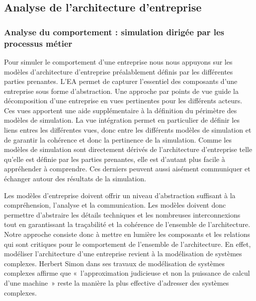     \subsection{Analyse de l'architecture d'entreprise}

        \subsubsection{Analyse du comportement : simulation dirigée par les processus
métier}

Pour simuler le comportement d'une entreprise nous nous appuyons sur les modèles
d'architecture d'entreprise préalablement définis par les différentes parties
prenantes. L'EA permet de capturer l'essentiel des composants d'une
entreprise sous forme d'abstraction. Une approche par points de vue guide la
décomposition d'une entreprise en vues pertinentes pour les différents acteurs.
Ces vues apportent une aide supplémentaire à la définition du périmètre des
modèles de simulation. La vue intégration permet en particulier de définir les
liens entres les différentes vues, donc entre les différents modèles de
simulation et de garantir la cohérence et donc la pertinence de la simulation.
Comme les modèles de simulation sont directement dérivés de l'architecture
d'entreprise telle qu'elle est définie par les parties prenantes, elle est
d'autant plus facile à appréhender à comprendre. Ces derniers peuvent aussi
aisément communiquer et échanger autour des résultats de la simulation.

Les modèles d'entreprise doivent offrir un niveau d'abstraction suffisant à la
compréhension, l'analyse et la communication. Les modèles doivent donc permettre
d'abstraire les détails techniques et les nombreuses interconnexions tout en
garantissant la traçabilité et la cohérence de l'ensemble de l'architecture.
Notre approche consiste donc à mettre en lumière les composants et les
relations qui sont critiques pour le comportement de l'ensemble de
l'architecture. En effet, modéliser l'architecture d'une entreprise revient à la
modélisation de systèmes complexes. Herbert Simon \cite{simon1990prediction}
dans ses travaux de modélisation de systèmes complexes affirme que
«~l'approximation judicieuse et non la puissance de calcul d'une machine~» reste
la manière la plus effective d'adresser des systèmes complexes.

